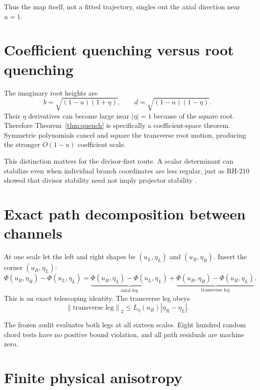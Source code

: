 \documentclass[12pt]{article}
\theoremstyle{remark}\newtheorem{remark}[theorem]{Remark}
\newcommand{\norm}[1]{\left\lVert#1\right\rVert}
\begin{document}
Thus the map itself, not a fitted trajectory, singles out the axial
direction near $u=1$.

\section{Coefficient quenching versus root quenching}

The imaginary root heights are
\begin{equation}
 b=\sqrt{(1-u)(1+\eta)},\qquad
 d=\sqrt{(1-u)(1-\eta)}.
\end{equation}
Their $\eta$ derivatives can become large near $|\eta|=1$ because of the
square root.  Therefore Theorem~\ref{thm:quench} is specifically a
coefficient-space theorem.  Symmetric polynomials cancel and square the
transverse root motion, producing the stronger $O(1-u)$ coefficient scale.

This distinction matters for the divisor-first route.  A scalar determinant
can stabilize even when individual branch coordinates are less regular, just
as RH-210 showed that divisor stability need not imply projector stability
\citep{WangRH210}.

\section{Exact path decomposition between channels}

At one scale let the left and right shapes be $(u_L,\eta_L)$ and
$(u_R,\eta_R)$.  Insert the corner $(u_R,\eta_L)$:
\begin{equation}\label{eq:path}
 \Phi(u_R,\eta_R)-\Phi(u_L,\eta_L)
 =\underbrace{\Phi(u_R,\eta_L)-\Phi(u_L,\eta_L)}_{\text{axial leg}}
 +\underbrace{\Phi(u_R,\eta_R)-\Phi(u_R,\eta_L)}_{\text{transverse leg}}.
\end{equation}
This is an exact telescoping identity.  The transverse leg obeys
\begin{equation}
 \norm{\text{transverse leg}}_2
 \le L_\eta(u_R)|\eta_R-\eta_L|.
\end{equation}

The frozen audit evaluates both legs at all sixteen scales.  Eight hundred
random chord tests have no positive bound violation, and all path residuals
are machine zero.

\section{Finite physical anisotropy}
\end{document}
